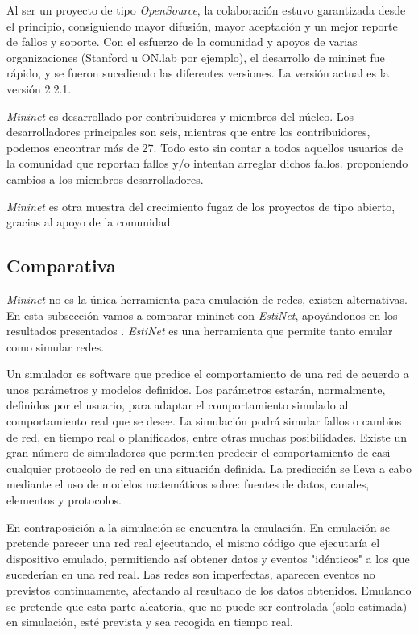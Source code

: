 \documentclass[a4paper,11pt]{book}
\begin{document}
Al ser un proyecto de tipo \textit{OpenSource}, la colaboración estuvo garantizada desde el principio, consiguiendo mayor difusión, mayor aceptación y un mejor reporte de fallos y soporte. Con el esfuerzo de la comunidad y apoyos de varias organizaciones (Stanford u ON.lab por ejemplo), el desarrollo de mininet fue rápido, y se fueron sucediendo las diferentes versiones. La versión actual es la versión 2.2.1.

\emph{Mininet} es desarrollado por contribuidores y miembros del núcleo. Los desarrolladores principales son seis, mientras que entre los contribuidores, podemos encontrar más de 27. Todo esto sin contar a todos aquellos usuarios de la comunidad que reportan fallos y/o intentan arreglar dichos fallos. proponiendo cambios a los miembros desarrolladores. 

\emph{Mininet} es otra muestra del crecimiento fugaz de los proyectos de tipo abierto, gracias al apoyo de la comunidad.

\subsection{Comparativa}
\emph{Mininet} no es la única herramienta para emulación de redes, existen alternativas. En esta subsección vamos a comparar mininet con \textit{EstiNet}\cite{estinet}, apoyándonos en los resultados presentados \cite{wang2014comparison}. \textit{EstiNet} es una herramienta que permite tanto emular como simular redes.

Un simulador es software que predice el comportamiento de una red de acuerdo a unos parámetros y modelos definidos. Los parámetros estarán, normalmente, definidos por el usuario, para adaptar el comportamiento simulado al comportamiento real que se desee. La simulación podrá simular fallos o cambios de red, en tiempo real o planificados, entre otras muchas posibilidades. Existe un gran número de simuladores que permiten predecir el comportamiento de casi cualquier protocolo de red en una situación definida. La predicción se lleva a cabo mediante el uso de modelos matemáticos sobre: fuentes de datos, canales, elementos y protocolos. 

En contraposición a la simulación se encuentra la emulación. En emulación se pretende parecer una red real ejecutando, el mismo código que ejecutaría el dispositivo emulado, permitiendo así obtener datos y eventos "idénticos" a los que sucederían en una red real. Las redes son imperfectas, aparecen eventos no previstos continuamente, afectando al resultado de los datos obtenidos. Emulando se pretende que esta parte aleatoria, que no puede ser controlada (solo estimada) en simulación, esté prevista y sea recogida en tiempo real. 
\end{document}
